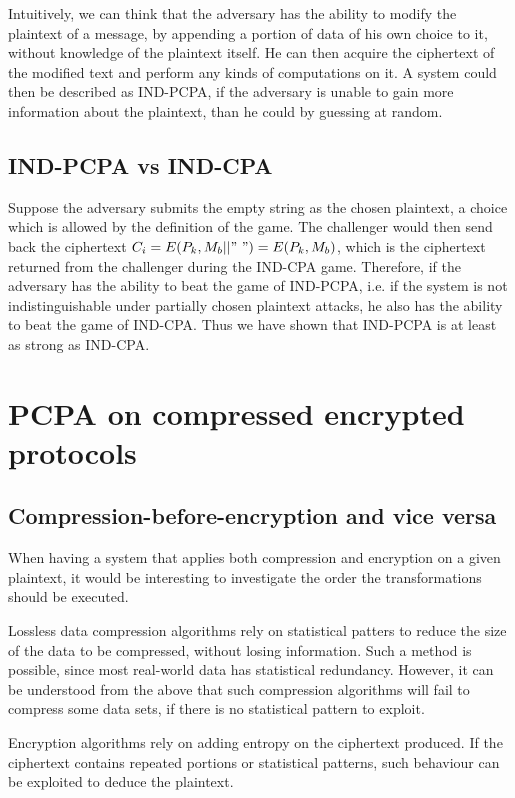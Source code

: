 Intuitively, we can think that the adversary has the ability to modify the
plaintext of a message, by appending a portion of data of his own choice to it,
without knowledge of the plaintext itself. He can then acquire the ciphertext of
the modified text and perform any kinds of computations on it. A system could
then be described as IND-PCPA, if the adversary is unable to gain more
information about the plaintext, than he could by guessing at random.

\subsection{IND-PCPA vs IND-CPA}

Suppose the adversary submits the empty string as the chosen plaintext, a choice
which is allowed by the definition of the game. The challenger would then send
back the ciphertext \begin{math}C_i = E(P_k, M_b||"\ ") = E(P_k, M_b)\end{math},
which is the ciphertext returned from the challenger during the IND-CPA game.
Therefore, if the adversary has the ability to beat the game of IND-PCPA, i.e.
if the system is not indistinguishable under partially chosen plaintext attacks,
    he also has the ability to beat the game of IND-CPA. Thus we have shown that
    IND-PCPA is at least as strong as IND-CPA.

\section{PCPA on compressed encrypted protocols}\label{sec:cepcpa}

\subsection{Compression-before-encryption and vice versa} When having a system
that applies both compression and encryption on a given plaintext, it would be
interesting to investigate the order the transformations should be executed.

Lossless data compression algorithms rely on statistical patters to reduce the
size of the data to be compressed, without losing information. Such a method is
possible, since most real-world data has statistical redundancy. However, it can
be understood from the above that such compression algorithms will fail to
compress some data sets, if there is no statistical pattern to exploit.

Encryption algorithms rely on adding entropy on the ciphertext produced. If the
ciphertext contains repeated portions or statistical patterns, such behaviour
can be exploited to deduce the plaintext.


